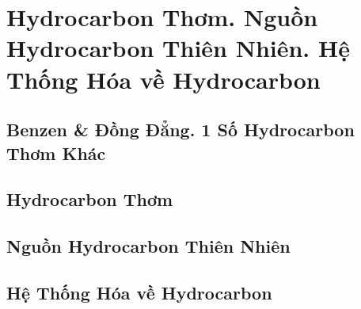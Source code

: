\documentclass{article}
\begin{document}
\section{Hydrocarbon Thơm. Nguồn Hydrocarbon Thiên Nhiên. Hệ Thống Hóa về Hydrocarbon}

\subsection{Benzen \& Đồng Đẳng. 1 Số Hydrocarbon Thơm Khác}


\subsection{Hydrocarbon Thơm}


\subsection{Nguồn Hydrocarbon Thiên Nhiên}


\subsection{Hệ Thống Hóa về Hydrocarbon}


\printbibliography[heading=bibintoc]
	
\end{document}
